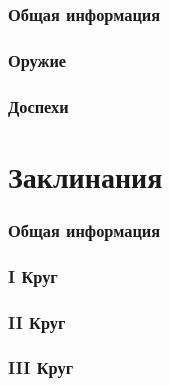 \documentclass[10pt,twoside,twocolumn,openany]{book}
\begin{document}
\section{Общая информация}
\lipsum[1]
\section{Оружие}
\lipsum[1]
\section{Доспехи}
\lipsum[1]

\part{Заклинания}
\section{Общая информация}
\lipsum[1]
\section{\textrm{I} Круг}
\lipsum[1]
\section{\textrm{II} Круг}
\lipsum[1]
\section{\textrm{III} Круг}
\lipsum[1]
\end{document}
